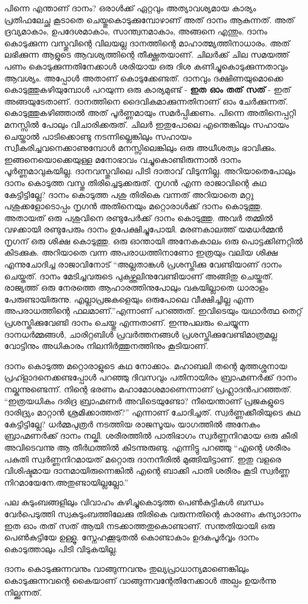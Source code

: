 പിന്നെ എന്താണ്‌ ദാനം? ഒരാൾക്ക് ഏറ്റവും അത്യാവശ്യമായ കാര്യം പ്രതിഫലേച്ഛ കൂടാതെ ചെയ്തുകൊടുക്കുമ്പോഴാണ്‌ അത് ദാനം ആകുന്നത്. അത് ദ്രവ്യമാകാം, ഉപദേശമാകാം, സാന്ത്വനമാകാം, അങ്ങനെ എന്തും. ദാനം കൊടുക്കുന്ന വസ്തുവിന്റെ വിലയല്ല ദാനത്തിന്റെ മാഹാത്മ്യത്തിനാധാരം. അത് ലഭിക്കുന്ന ആളുടെ ആവശ്യത്തിന്റെ തീക്ഷ്ണതയാണ്‌. ചിലർക്ക് ചില സമയത്ത് പണം കൊടുക്കുന്നതിനേക്കാൾ ശരിയായ ഒരു ദിശ കണിച്ചുകൊടുക്കുന്നതാവും ആവശ്യം. അപ്പോൾ അതാണ്‌ കൊടുക്കേണ്ടത്.
ദാനവും ദക്ഷിണയുമൊക്കെ കൊടുത്തുകഴിയുമ്പോൾ പറയുന്ന ഒരു കാര്യമുണ്ട് - \textbf{ഇത ഓം തത് സത്} - ഇത് അങ്ങയുടേതാണ്. ദാനത്തിനെ ദൈവികമാക്കുന്നതിനാണ്‌ ഓം ചേർക്കുന്നത്. കൊടുത്തുകഴിഞ്ഞാൽ അത് പൂർണ്ണമായും സമർപ്പിക്കണം. പിന്നെ അതിനെപ്പറ്റി മനസ്സിൽ പോലും വിചാരിക്കരുത്. ചിലർ ഇതുപോലെ എന്തെങ്കിലും സഹായം ചെയ്താൽ പാടിക്കൊണ്ടു നടന്നില്ലെങ്കിലും സഹായം സ്വീകരിച്ചവനെക്കാണുമ്പോൾ മനസ്സിലെങ്കിലും ഒരു അധീശത്വം ഭാവിക്കും. ഇങ്ങനെയൊക്കെയുള്ള മനോഭാവം വച്ചുകൊണ്ടിരുന്നാൽ ദാനം പൂർണ്ണമാവുകയില്ല. ദാനവസ്തുവിലെ പിടി ദാതാവ് വിടുന്നില്ല. അറിയാതെപോലും ദാനം കൊടുത്ത വസ്തു തിരിച്ചെടുക്കരുത്. നൃഗൻ എന്ന രാജാവിന്റെ കഥ കേട്ടിട്ടില്ലേ? ദാനം കൊടുത്ത പശു തിരികെ വന്നത് അറിയാതെ മറ്റു പശുക്കളോടൊപ്പം നൃഗൻ അതിനെയും മറ്റൊരാൾക്ക് ദാനം കൊടുത്തു. അതായത് ഒരു പശുവിനെ രണ്ടുപേർക്ക് ദാനം കൊടുത്തു. അവർ തമ്മിൽ വഴക്കായി രണ്ടുപേരും ദാനം ഉപേക്ഷിച്ചുപോയി. മരണകാലത്ത് യമധർമ്മൻ നൃഗന്‌ ഒരു ശിക്ഷ കൊടുത്തു. ഒരു ഓന്തായി അനേകകാലം ഒരു പൊട്ടക്കിണറ്റിൽ കിടക്കുക. അറിയാതെ വന്ന അപരാധത്തിനാണോ ഇത്രയും വലിയ ശിക്ഷ എന്നുചോദിച്ച രാജാവിനോട് “അല്ലതാങ്കൾ പ്രശസ്തിക്കു വേണ്ടിയാണ്‌ ദാനം ചെയ്തത്. ദാനം മേടിച്ചവരുടെ പുകഴ്ത്തലിനുവേണ്ടിയാണ് അങ്ങിതു ചെയ്തത്. രാജ്യത്ത് ഒരു നേരത്തെ ആഹാരത്തിനുപോലും വകയില്ലാതെ ധാരാളം പേരുണ്ടായിരുന്നു. എല്ലാപ്രജകളെയും ഒരുപോലെ വീക്ഷിച്ചില്ല എന്ന അപരാധത്തിന്റെ ഫലമാണ്‌.”എന്നാണ്‌ പറഞ്ഞത്. ഇവിടെയും യഥാർത്ഥ തെറ്റ് പ്രശസ്തിക്കുവേണ്ടി ദാനം ചെയ്തു എന്നതാണ്. ഇന്നുപലരും ചെയ്യുന്ന ദാനധർമ്മങ്ങൾ, ചാരിറ്റബിൾ പ്രവർത്തനങ്ങൾ പ്രശസ്തിക്കുവേണ്ടിമാത്രമല്ല വോട്ടിനും അധികാരം നിലനിർത്തുനത്തിനും കൂടിയാണ്‌.\par
ദാനം കൊടുത്ത മറ്റൊരാളുടെ കഥ നോക്കാം. മഹാബലി തന്റെ മുത്തശ്ശനായ പ്രഹ്ളാദനെക്കണ്ടപ്പോൾ പറഞ്ഞു ദിവസവും പതിനായിരം ബ്രാഹ്മണർക്ക് ദാനം നല്കുന്നുണ്ടെന്ന്. നിന്റെ ഭരണം മഹാമോശമാണെന്നാണ്‌ പ്രഹ്ലാദൻപറഞ്ഞത്. “ഇത്രയധികം ദരിദ്ര ബ്രാഹ്മണർ അവിടെയുണ്ടോ? നീയെന്താണ്‌ പ്രജകളുടെ ദാരിദ്ര്യം മാറ്റാൻ ശ്രമിക്കാത്തത്?” എന്നാണ്‌ ചോദിച്ചത്.
സ്വർണ്ണക്കീരിയുടെ കഥ കേട്ടിട്ടില്ലേ? ധർമ്മപുത്രർ നടത്തിയ രാജസൂയം യാഗത്തിൽ അനേകം ബ്രാഹ്മണർക്ക് ദാനം നല്കി. ശരീരത്തിൽ പാതിഭാഗം സ്വർണ്ണനിറമായ ഒരു കീരി അവിടെവന്നു ആ തീർഥത്തിൽ കിടന്നുരുണ്ടു. എന്നിട്ടു പറഞ്ഞു “എന്റെ ശരീരം പകുതി സ്വർണ്ണനിറമായത് മറ്റൊരു ദാനനീരിൽ മുങ്ങിയിട്ടാണ്‌. ഇതു വളരെ വിശിഷ്ടമായ ദാനമായിരുന്നെങ്കിൽ എന്റെ ബാക്കി പാതി ശരീരം കൂടി സ്വർണ്ണ നിറമായേനേ.അതുണ്ടായില്ലല്ലോ.”\par
പല കുടുംബങ്ങളിലും വിവാഹം കഴിച്ചുകൊടുത്ത പെൺകുട്ടികൾ ബന്ധം വേർപെടുത്തി സ്വകുടുംബത്തിലേക്കു തിരികെ വരുന്നതിന്റെ കാരണം കന്യാദാനം ഇത ഓം തത് സത് ആയി നടക്കാത്തതുകൊണ്ടാണ്. സന്തതിയായി ഒരു പെൺകുട്ടിയേ ഉള്ളൂ. സ്നേഹക്കൂടുതൽ കൊണ്ടാകാം ഉദകപൂർവ്വം ദാനം കൊടുത്താലും പിടി വിടുകയില്ല.\par

ദാനം കൊടുക്കുന്നവനും വാങ്ങുന്നവനും തുല്യപ്രാധാന്യമാണെങ്കിലും കൊടുക്കുന്നവന്റെ കൈയാണ്‌ വാങ്ങുന്നവന്റേതിനേക്കാൾ അല്പം ഉയർന്നു നില്ക്കുന്നത്.

